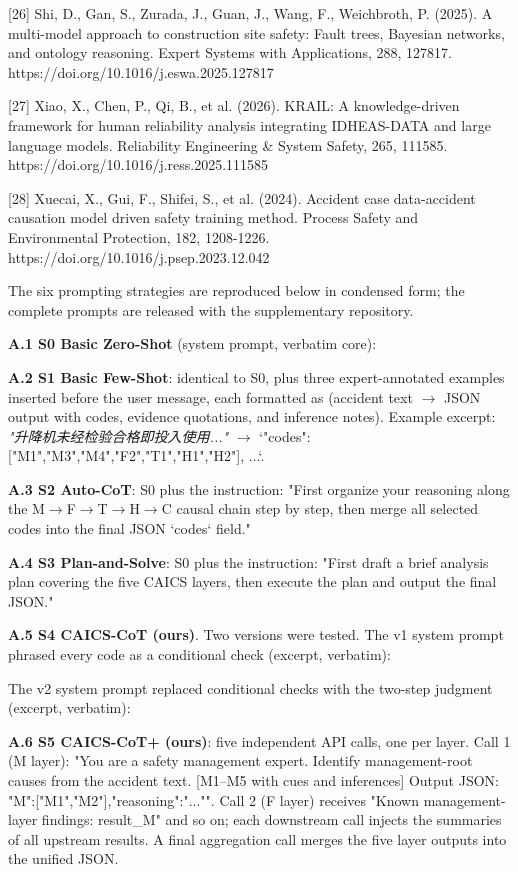 \documentclass[11pt]{article}
\begin{document}
[26] Shi, D., Gan, S., Zurada, J., Guan, J., Wang, F., Weichbroth, P. (2025). A multi-model approach to construction site safety: Fault trees, Bayesian networks, and ontology reasoning. Expert Systems with Applications, 288, 127817. https://doi.org/10.1016/j.eswa.2025.127817

[27] Xiao, X., Chen, P., Qi, B., et al. (2026). KRAIL: A knowledge-driven framework for human reliability analysis integrating IDHEAS-DATA and large language models. Reliability Engineering \& System Safety, 265, 111585. https://doi.org/10.1016/j.ress.2025.111585

[28] Xuecai, X., Gui, F., Shifei, S., et al. (2024). Accident case data-accident causation model driven safety training method. Process Safety and Environmental Protection, 182, 1208-1226. https://doi.org/10.1016/j.psep.2023.12.042

\appendix
The six prompting strategies are reproduced below in condensed form; the complete prompts are released with the supplementary repository.

\textbf{A.1 S0 Basic Zero-Shot} (system prompt, verbatim core):

\textbf{A.2 S1 Basic Few-Shot}: identical to S0, plus three expert-annotated examples inserted before the user message, each formatted as (accident text $\rightarrow$ JSON output with codes, evidence quotations, and inference notes). Example excerpt: \textit{"{\cjkfont 升降机未经检验合格即投入使用}..."} $\rightarrow$ `{"codes":["M1","M3","M4","F2","T1","H1","H2"], ...}`.

\textbf{A.3 S2 Auto-CoT}: S0 plus the instruction: "First organize your reasoning along the M$\rightarrow$F$\rightarrow$T$\rightarrow$H$\rightarrow$C causal chain step by step, then merge all selected codes into the final JSON `codes` field."

\textbf{A.4 S3 Plan-and-Solve}: S0 plus the instruction: "First draft a brief analysis plan covering the five CAICS layers, then execute the plan and output the final JSON."

\textbf{A.5 S4 CAICS-CoT (ours)}. Two versions were tested. The v1 system prompt phrased every code as a conditional check (excerpt, verbatim):

The v2 system prompt replaced conditional checks with the two-step judgment (excerpt, verbatim):

\textbf{A.6 S5 CAICS-CoT+ (ours)}: five independent API calls, one per layer. Call 1 (M layer): "You are a safety management expert. Identify management-root causes from the accident text. [M1--M5 with cues and inferences] Output JSON: {"M":["M1","M2"],"reasoning":"..."}". Call 2 (F layer) receives "Known management-layer findings: {result\_M}" and so on; each downstream call injects the summaries of all upstream results. A final aggregation call merges the five layer outputs into the unified JSON.
\end{document}
